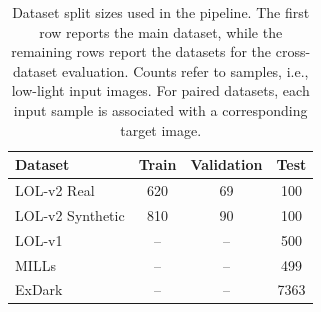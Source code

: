 \begin{table}[t]
	\centering
	\caption{Dataset split sizes used in the pipeline. The first row reports the main dataset, while the remaining rows report the datasets for the cross-dataset evaluation. Counts refer to samples, i.e., low-light input images. For paired datasets, each input sample is associated with a corresponding target image.}
	\label{tab:dataset_splits}
	\begin{tabular}{lccc}
		\toprule
		Dataset & Train & Validation & Test \\
		\midrule
		LOL-v2 Real & 620 & 69 & 100 \\
		\midrule
		LOL-v2 Synthetic & 810 & 90 & 100 \\
		LOL-v1 & -- & -- & 500 \\
		MILLs & -- & -- & 499 \\
		ExDark & -- & -- & 7363 \\
		\bottomrule
	\end{tabular}
\end{table}